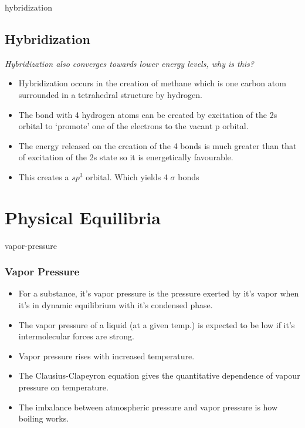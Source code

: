 \documentclass[12pt]{article}
\begin{document}
 {hybridization}{%
\subsection{Hybridization}\label{hybridization}}

\emph{Hybridization also converges towards lower energy levels, why is
this?}

\begin{itemize}
\item
  Hybridization occurs in the creation of methane which is one carbon
  atom surrounded in a tetrahedral structure by hydrogen.
\item
  The bond with 4 hydrogen atoms can be created by excitation of the 2s
  orbital to `promote' one of the electrons to the vacant p orbital.
\item
  The energy released on the creation of the 4 bonds is much greater
  than that of excitation of the 2s state so it is energetically
  favourable.
\item
  This creates a \(sp^3\) orbital. Which yields 4 \(\sigma\) bonds
\end{itemize}

\section{Physical Equilibria}\label{physical-equilibria}

 {vapor-pressure}{%
\subsubsection{Vapor Pressure}\label{vapor-pressure}}

\begin{itemize}
\item
  For a substance, it's vapor pressure is the pressure exerted by it's
  vapor when it's in dynamic equilibrium with it's condensed phase.
\item
  The vapor pressure of a liquid (at a given temp.) is expected to be
  low if it's intermolecular forces are strong.
\item
  Vapor pressure rises with increased temperature.
\item
  The Clausius-Clapeyron equation gives the quantitative dependence of
  vapour pressure on temperature.
\item
  The imbalance between atmospheric pressure and vapor pressure is how
  boiling works.
\end{itemize}
\end{document}
